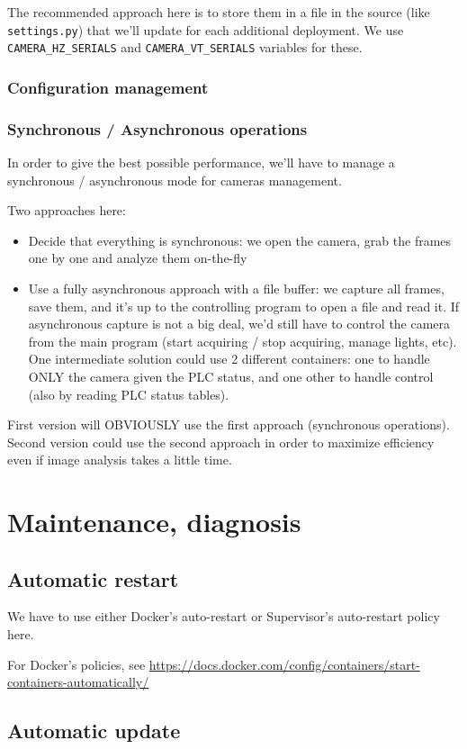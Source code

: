 The recommended approach here is to store them in a file in the source (like \texttt{settings.py}) that we'll update for each additional deployment. We use \texttt{CAMERA_HZ_SERIALS} and \texttt{CAMERA_VT_SERIALS} variables for these.

\subsubsection{Configuration management}


\subsubsection{Synchronous / Asynchronous operations}

In order to give the best possible performance, we'll have to manage a synchronous / asynchronous mode
for cameras management.

Two approaches here:

\begin{itemize}
    \item Decide that everything is synchronous: we open the camera, grab the frames one by one
        and analyze them on-the-fly
    \item Use a fully asynchronous approach with a file buffer: we capture all frames, save them,
        and it's up to the controlling program to open a file and read it.
        If asynchronous capture is not a big deal, we'd still have to control the camera from the
        main program (start acquiring / stop acquiring, manage lights, etc).
        One intermediate solution could use 2 different containers: one to handle ONLY the camera
        given the PLC status, and one other to handle control (also by reading PLC status tables).
\end{itemize}

First version will OBVIOUSLY use the first approach (synchronous operations). Second version
could use the second approach in order to maximize efficiency even if image analysis takes
a little time.


\section{Maintenance, diagnosis}

\subsection{Automatic restart}


We have to use either Docker's auto-restart or Supervisor's auto-restart policy here.

For Docker's policies, see \url{https://docs.docker.com/config/containers/start-containers-automatically/}


\subsection{Automatic update}

